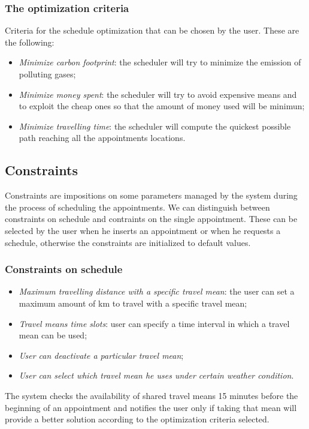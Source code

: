  
\subsubsection{The optimization criteria} \label{subsubsect:optcriteria} 
Criteria for the schedule optimization that can be chosen by the user. These are the following:
\begin{itemize}
\item \textit{Minimize carbon footprint}: the scheduler will try to minimize the emission of polluting gases;
\item \textit{Minimize money spent}: the scheduler will try to avoid expensive means and to exploit the cheap ones so that the amount of money used will be minimun;
\item \textit{Minimize travelling time}: the scheduler will compute the quickest possible path reaching all the appointments locations.
\end{itemize}

\subsection{Constraints}
Constraints are impositions on some parameters managed by the system during the process of scheduling the appointments. We can distinguish between constraints on schedule and contraints on the single appointment. These can be selected by the user when he inserts an appointment or when he requests a schedule, otherwise the constraints are initialized to default values. 

\subsubsection{Constraints on schedule} 
\begin{itemize}
\item \textit{Maximum travelling distance with a specific travel mean}: the user can set a maximum amount of km to travel with a specific travel mean;
\item\textit{ Travel means time slots}: user can specify a time interval in which a travel mean can be used;
\item \textit{User can deactivate a particular travel mean};
\item \textit{User can select which travel mean he uses under certain weather condition}.
\end{itemize}

The system checks the availability of shared travel means 15 minutes before the beginning of an appointment and notifies the user only if taking that mean will provide a better solution according to the optimization criteria selected.

